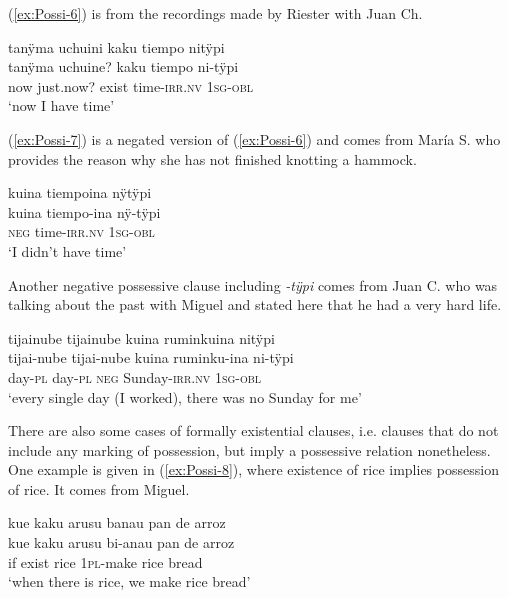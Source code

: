 (\ref{ex:Possi-6}) is from the recordings made by Riester with Juan Ch.

\ea\label{ex:Possi-6}
\begingl
\glpreamble tanÿma uchuini kaku tiempo nitÿpi\\
\gla tanÿma uchuine? kaku tiempo ni-tÿpi\\
\glb now just.now? exist time-\textsc{irr.nv} 1\textsc{sg}-\textsc{obl}\\
\glft ‘now I have time’
\endgl
\trailingcitation{[nxx-p630101g-1.012]}
\xe

(\ref{ex:Possi-7}) is a negated version of (\ref{ex:Possi-6}) and comes from María S. who provides the reason why she has not finished knotting a hammock.

\ea\label{ex:Possi-7}
\begingl
\glpreamble kuina tiempoina nÿtÿpi\\
\gla kuina tiempo-ina nÿ-tÿpi\\
\glb \textsc{neg} time-\textsc{irr.nv} 1\textsc{sg}-\textsc{obl}\\
\glft ‘I didn’t have time’
\endgl
\trailingcitation{[rxx-e181022le]}
\xe

Another negative possessive clause including \textit{-tÿpi} comes from Juan C. who was talking about the past with Miguel and stated here that he had a very hard life.

\ea\label{ex:Exi-10}
\begingl
\glpreamble tijainube tijainube kuina ruminkuina nitÿpi\\
\gla tijai-nube tijai-nube kuina ruminku-ina ni-tÿpi\\
\glb day-\textsc{pl} day-\textsc{pl} \textsc{neg} Sunday-\textsc{irr.nv} 1\textsc{sg}-\textsc{obl}\\
\glft ‘every single day (I worked), there was no Sunday for me’
\endgl
\trailingcitation{[mqx-p110826l.467]}
\xe

There are also some cases of formally existential clauses, i.e. clauses that do not include any marking of possession, but imply a possessive relation nonetheless. One example is given in (\ref{ex:Possi-8}), where existence of rice implies possession of rice. It comes from Miguel.

\ea\label{ex:Possi-8}
\begingl
\glpreamble kue kaku arusu banau pan de arroz\\
\gla kue kaku arusu bi-anau {pan de arroz}\\
\glb if exist rice 1\textsc{pl}-make {rice bread}\\
\glft ‘when there is rice, we make rice bread’
\endgl
\trailingcitation{[mxx-d120411ls-1a.042]}
\xe

